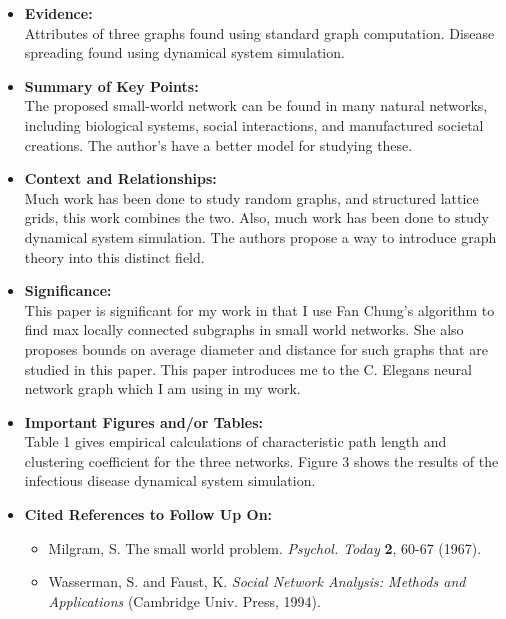 \documentclass{article}
\begin{document}
\begin{itemize}
\begin{itemize}
\end{itemize}
\item{\textbf{Evidence:}}
\\
Attributes of three graphs found using standard graph computation. Disease spreading found using dynamical system simulation.
\item{\textbf{Summary of Key Points:}}
\\
The proposed small-world network can be found in many natural networks, including biological systems, social interactions, and manufactured societal creations. The author's have a better model for studying these.
\item{\textbf{Context and Relationships:}}
\\
Much work has been done to study random graphs, and structured lattice grids, this work combines the two. Also, much work has been done to study dynamical system simulation. The authors propose a way to introduce graph theory into this distinct field.

\item{\textbf{Significance:}}
\\
This paper is significant for my work in that I use Fan Chung's algorithm to find max locally connected subgraphs in small world networks. She also proposes bounds on average diameter and distance for such graphs that are studied in this paper. This paper introduces me to the C. Elegans neural network graph which I am using in my work.
\item{\textbf{Important Figures and/or Tables:}}
\\
Table 1 gives empirical calculations of characteristic path length and clustering coefficient for the three networks. Figure 3 shows the results of the infectious disease dynamical system simulation.

\item{\textbf{Cited References to Follow Up On:}}
\\
\begin{itemize}
\item Milgram, S. The small world problem. \textit{Psychol. Today} \textbf{2}, 60-67 (1967).
\item Wasserman, S. and Faust, K. \textit{Social Network Analysis: Methods and Applications} (Cambridge Univ. Press, 1994).
\end{itemize}
\end{itemize}
\end{document}

